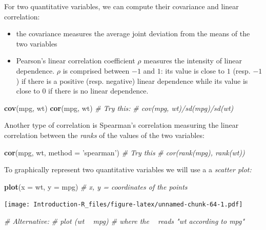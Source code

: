 \documentclass[]{book}
\newenvironment{Shaded}{\begin{snugshade}}{\end{snugshade}}
\newcommand{\CommentTok}[1]{\textcolor[rgb]{0.56,0.35,0.01}{\textit{#1}}}
\newcommand{\DataTypeTok}[1]{\textcolor[rgb]{0.13,0.29,0.53}{#1}}
\newcommand{\KeywordTok}[1]{\textcolor[rgb]{0.13,0.29,0.53}{\textbf{#1}}}
\newcommand{\NormalTok}[1]{#1}
\newcommand{\StringTok}[1]{\textcolor[rgb]{0.31,0.60,0.02}{#1}}
\providecommand{\tightlist}{%
  \setlength{\itemsep}{0pt}\setlength{\parskip}{0pt}}
\begin{document}
For two quantitative variables, we can compute their covariance and linear correlation:

\begin{itemize}
\tightlist
\item
  the covariance measures the average joint deviation from the means of the two variables
\item
  Pearson's linear correlation coefficient \(\rho\) measures the intensity of linear dependence. \(\rho\) is comprised between \(-1\) and \(1\): its value is close to \(1\) (resp. \(-1\)) if there is a positive (resp. negative) linear dependence while its value is close to \(0\) if there is no linear dependence.
\end{itemize}

\begin{Shaded}
\begin{Highlighting}[]
\KeywordTok{cov}\NormalTok{(mpg, wt)}
\KeywordTok{cor}\NormalTok{(mpg, wt)}
\CommentTok{# Try this:}
\CommentTok{# cov(mpg, wt)/sd(mpg)/sd(wt)}
\end{Highlighting}
\end{Shaded}

Another type of correlation is Spearman's correlation measuring the linear correlation between the \emph{ranks} of the values of the two variables:

\begin{Shaded}
\begin{Highlighting}[]
\KeywordTok{cor}\NormalTok{(mpg, wt, }\DataTypeTok{method =} \StringTok{'spearman'}\NormalTok{)}
\CommentTok{# Try this}
\CommentTok{# cor(rank(mpg), rank(wt))}
\end{Highlighting}
\end{Shaded}

To graphically represent two quantitative variables we will use a a \emph{scatter plot:}

\begin{Shaded}
\begin{Highlighting}[]
\KeywordTok{plot}\NormalTok{(}\DataTypeTok{x =}\NormalTok{ wt, }\DataTypeTok{y =}\NormalTok{ mpg) }\CommentTok{# x, y = coordinates of the points}
\end{Highlighting}
\end{Shaded}

\texttt{[image: Introduction-R\_files/figure-latex/unnamed-chunk-64-1.pdf]}

\begin{Shaded}
\begin{Highlighting}[]
\CommentTok{# Alternative: }
\CommentTok{# plot (wt ~ mpg) # where the ~ reads "wt according to mpg"}
\end{Highlighting}
\end{Shaded}
\end{document}
